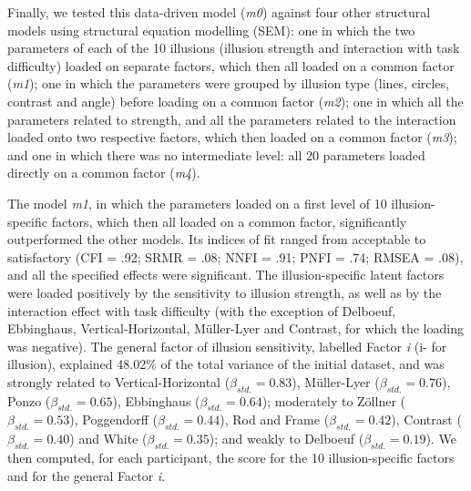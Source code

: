 \documentclass[
  man,floatsintext]{apa6}
\begin{document}
Finally, we tested this data-driven model (\emph{m0}) against four other structural models using structural equation modelling (SEM): one in which the two parameters of each of the 10 illusions (illusion strength and interaction with task difficulty) loaded on separate factors, which then all loaded on a common factor (\emph{m1}); one in which the parameters were grouped by illusion type (lines, circles, contrast and angle) before loading on a common factor (\emph{m2}); one in which all the parameters related to strength, and all the parameters related to the interaction loaded onto two respective factors, which then loaded on a common factor (\emph{m3}); and one in which there was no intermediate level: all 20 parameters loaded directly on a common factor (\emph{m4}).

The model \emph{m1}, in which the parameters loaded on a first level of 10 illusion-specific factors, which then all loaded on a common factor, significantly outperformed the other models. Its indices of fit ranged from acceptable to satisfactory (CFI = .92; SRMR = .08; NNFI = .91; PNFI = .74; RMSEA = .08), and all the specified effects were significant. The illusion-specific latent factors were loaded positively by the sensitivity to illusion strength, as well as by the interaction effect with task difficulty (with the exception of Delboeuf, Ebbinghaus, Vertical-Horizontal, Müller-Lyer and Contrast, for which the loading was negative). The general factor of illusion sensitivity, labelled Factor \emph{i} (i- for illusion), explained 48.02\% of the total variance of the initial dataset, and was strongly related to Vertical-Horizontal (\(\beta_{std.}=0.83\)), Müller-Lyer (\(\beta_{std.}=0.76\)), Ponzo (\(\beta_{std.}=0.65\)), Ebbinghaus (\(\beta_{std.}=0.64\)); moderately to Zöllner (\(\beta_{std.}=0.53\)), Poggendorff (\(\beta_{std.}=0.44\)), Rod and Frame (\(\beta_{std.}=0.42\)), Contrast (\(\beta_{std.}=0.40\)) and White (\(\beta_{std.}=0.35\)); and weakly to Delboeuf (\(\beta_{std.}=0.19\)). We then computed, for each participant, the score for the 10 illusion-specific factors and for the general Factor \emph{i}.
\end{document}
